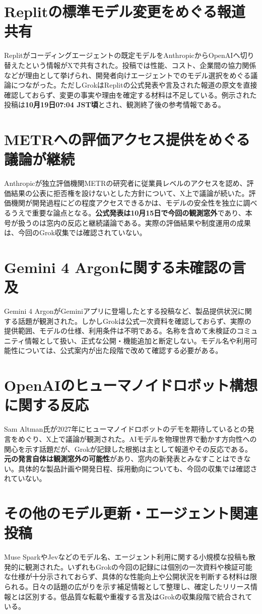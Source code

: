 \section{Replitの標準モデル変更をめぐる報道共有}
Replitがコーディングエージェントの既定モデルをAnthropicからOpenAIへ切り替えたという情報がXで共有された。投稿では性能、コスト、企業間の協力関係などが理由として挙げられ、開発者向けエージェントでのモデル選択をめぐる議論につながった。ただしGrokはReplitの公式発表や言及された報道の原文を直接確認しておらず、変更の事実や理由を確定する材料は不足している。例示された投稿は\textbf{10月19日07:04 JST頃}とされ、観測終了後の参考情報である。

\section{METRへの評価アクセス提供をめぐる議論が継続}
Anthropicが独立評価機関METRの研究者に従業員レベルのアクセスを認め、評価結果の公表に拒否権を設けないとした方針について、X上で議論が続いた。評価機関が開発過程にどの程度アクセスできるかは、モデルの安全性を独立に調べるうえで重要な論点となる。\textbf{公式発表は10月15日で今回の観測窓外}であり、本号が扱うのは窓内の反応と継続議論である。実際の評価結果や制度運用の成果は、今回のGrok収集では確認されていない。

\section{Gemini 4 Argonに関する未確認の言及}
Gemini 4 ArgonがGeminiアプリに登場したとする投稿など、製品提供状況に関する話題が観測された。しかしGrokは公式一次資料を確認しておらず、実際の提供範囲、モデルの仕様、利用条件は不明である。名称を含めて未検証のコミュニティ情報として扱い、正式な公開・機能追加と断定しない。モデル名や利用可能性については、公式案内が出た段階で改めて確認する必要がある。

\section{OpenAIのヒューマノイドロボット構想に関する反応}
Sam Altman氏が2027年にヒューマノイドロボットのデモを期待しているとの発言をめぐり、X上で議論が観測された。AIモデルを物理世界で動かす方向性への関心を示す話題だが、Grokが記録した根拠は主として報道やその反応である。\textbf{元の発言自体は観測窓外の可能性}があり、窓内の新発表とみなすことはできない。具体的な製品計画や開発日程、採用動向についても、今回の収集では確認されていない。

\section{その他のモデル更新・エージェント関連投稿}
Muse SparkやJevなどのモデル名、エージェント利用に関する小規模な投稿も散発的に観測された。いずれもGrokの今回の記録には個別の一次資料や検証可能な仕様が十分示されておらず、具体的な性能向上や公開状況を判断する材料は限られる。日々の話題の広がりを示す補足情報として整理し、確定したリリース情報とは区別する。低品質な転載や重複する言及はGrokの収集段階で統合されている。
